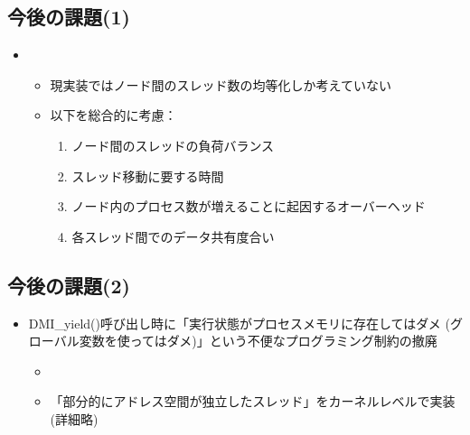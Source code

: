 \documentclass[25pt,papersize,landscape]{jsarticle}
\begin{document}

\subsection{今後の課題(1)}

\begin{itemize}
\item {}
  \begin{itemize}
  \item 現実装ではノード間のスレッド数の均等化しか考えていない
  \item 以下を総合的に考慮：
    \begin{enumerate}
    \item ノード間のスレッドの負荷バランス
    \item スレッド移動に要する時間
    \item ノード内のプロセス数が増えることに起因するオーバーヘッド
    \item 各スレッド間でのデータ共有度合い
    \end{enumerate}
  \end{itemize}
\end{itemize}

\subsection{今後の課題(2)}

\begin{itemize}
\item DMI\_yield()呼び出し時に「実行状態がプロセスメモリに存在してはダメ
  (グローバル変数を使ってはダメ)」という不便なプログラミング制約の撤廃
  \begin{itemize}
  \item {}
  \item 「部分的にアドレス空間が独立したスレッド」をカーネルレベルで実装(詳細略)
  \end{itemize}
\end{itemize}

\thankyou
\end{document}
